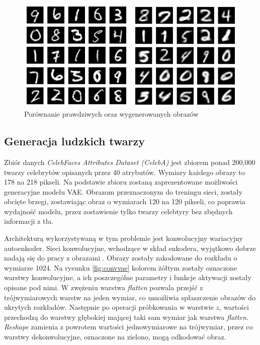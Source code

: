 \documentclass[a4paper,12pt,oneside]{book} %
\begin{document}
\begin{figure}[h!]
	\centering
	\includegraphics[width=12cm]{vaegeneracja.png}
	\caption{Porównanie prawdziwych oraz wygenerowanych obrazów}
	\label{fig:vaegeneracja}
\end{figure}

\subsection{Generacja ludzkich twarzy}
Zbiór danych \textit{CelebFaces Attributes Dataset (CelebA)} \cite{celeba} jest zbiorem ponad 200,000 twarzy celebrytów opisanych przez 40 atrybutów. Wymiary każdego obrazy to 178 na 218 pikseli. Na podstawie zbioru zostaną zaprezentowane możliwości generacyjne modelu VAE. Obrazom przeznaczonym do treningu sieci, zostały obcięte brzegi, zostawiając obraz o wymiarach 120 na 120 pikseli, co poprawia wydajność modelu, przez zostawienie tylko twarzy celebtyry bez zbędnych informacji z tła.

Architekturą wykorzystywaną w tym problemie jest konwolucyjny wariacyjny autoenkoder. Sieci konwolucyjne, wchodzące w skład enkodera, wyjątkowo dobrze nadają się do pracy z obrazami \cite{convvae}. Obrazy zostały zakodowane do rozkładu o wymiarze 1024. Na rysunku \ref{fig:convvae} kolorem żółtym zostały oznaczone warstwy konwolucyjne, a ich poszczególne parametry i funkcje aktywacji zostały opisane pod nimi. W zwężeniu warstwa \textit{flatten} pozwala przejść z trójwymiarowych warstw na jeden wymiar, co umożliwia spłaszczenie obrazów do ukrytych rozkładów. Następnie po operacji próbkowania w warstwie $z$, wartości przechodzą do warstwy głębokiej mającej taki sam wymiar jak warstwa \textit{flatten}. \textit{Reshape} zamienia z powrotem wartości jednowymiarowe na trójwymiar, przez co warstwy dekonwolucyjne, oznaczone na zielono, mogą odkodować obraz.
\end{document}
